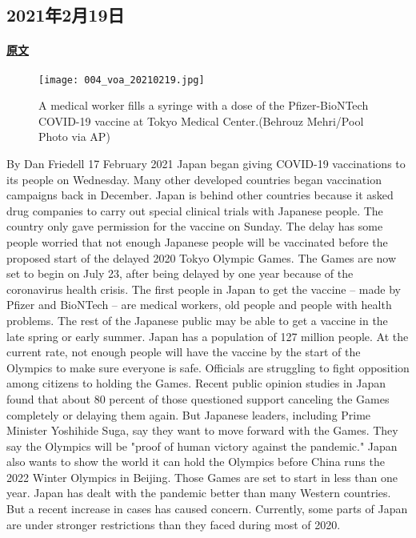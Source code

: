 \subsection{2021年2月19日}
\paragraph{\href{https://www.51voa.com/VOA_Special_English/japan-starts-covid--vaccinations-86319.html}{原文}}

\begin{figure}[H]
\centering
\texttt{[image: 004\_voa\_20210219.jpg]}
\caption{A medical worker fills a syringe with a dose of the Pfizer-BioNTech COVID-19 vaccine at Tokyo Medical Center.(Behrouz Mehri/Pool Photo via AP)}
\end{figure}

By Dan Friedell
17 February 2021
Japan began giving COVID-19 vaccinations to its people on Wednesday. Many other developed countries began vaccination campaigns back in December.
Japan is behind other countries because it asked drug companies to carry out special clinical trials with Japanese people. The country only gave permission for the vaccine on Sunday.
The delay has some people worried that not enough Japanese people will be vaccinated before the proposed start of the delayed 2020 Tokyo Olympic Games.
The Games are now set to begin on July 23, after being delayed by one year because of the coronavirus health crisis.
The first people in Japan to get the vaccine -- made by Pfizer and BioNTech -- are medical workers, old people and people with health problems.
The rest of the Japanese public may be able to get a vaccine in the late spring or early summer.
Japan has a population of 127 million people. At the current rate, not enough people will have the vaccine by the start of the Olympics to make sure everyone is safe.
Officials are struggling to fight opposition among citizens to holding the Games. Recent public opinion studies in Japan found that about 80 percent of those questioned support canceling the Games completely or delaying them again.
But Japanese leaders, including Prime Minister Yoshihide Suga, say they want to move forward with the Games. They say the Olympics will be "proof of human victory against the pandemic."
Japan also wants to show the world it can hold the Olympics before China runs the 2022 Winter Olympics in Beijing. Those Games are set to start in less than one year.
Japan has dealt with the pandemic better than many Western countries. But a recent increase in cases has caused concern. Currently, some parts of Japan are under stronger restrictions than they faced during most of 2020.
